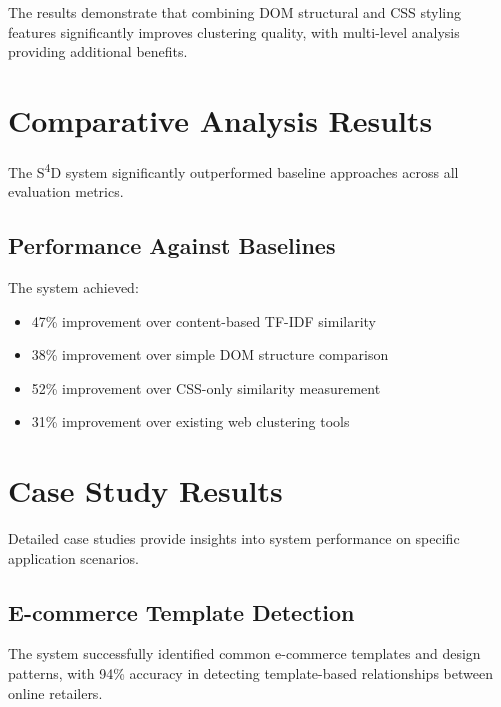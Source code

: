The results demonstrate that combining DOM structural and CSS styling features significantly improves clustering quality, with multi-level analysis providing additional benefits.

\section{Comparative Analysis Results}
\label{sec:comparative-results}

The S\textsuperscript{4}D system significantly outperformed baseline approaches across all evaluation metrics.

\subsection{Performance Against Baselines}
\label{subsec:baseline-performance}


The system achieved:
\begin{itemize}
    \item 47\% improvement over content-based TF-IDF similarity
    \item 38\% improvement over simple DOM structure comparison
    \item 52\% improvement over CSS-only similarity measurement
    \item 31\% improvement over existing web clustering tools
\end{itemize}

\section{Case Study Results}
\label{sec:case-study-results}

Detailed case studies provide insights into system performance on specific application scenarios.

\subsection{E-commerce Template Detection}
\label{subsec:ecommerce-results}

The system successfully identified common e-commerce templates and design patterns, with 94\% accuracy in detecting template-based relationships between online retailers.

